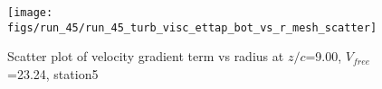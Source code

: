 \begin{figure}[H]
\centering
\texttt{[image: figs/run\_45/run\_45\_turb\_visc\_ettap\_bot\_vs\_r\_mesh\_scatter]}
\caption{Scatter plot of velocity gradient term vs radius at $z/c$=9.00, $V_{free}$=23.24, station5}
\label{fig:run_45_turb_visc_ettap_bot_vs_r_mesh_scatter}
\end{figure}


